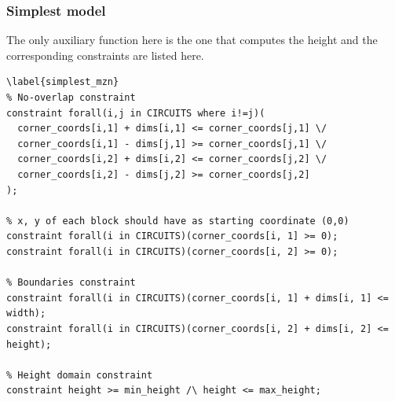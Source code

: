 \subsubsection{Simplest model}\label{simplest_model}
The only auxiliary function here is the one that computes the height and the corresponding constraints are listed here.
\begin{center}
    \begin{lstlisting}[language=Mzn]\label{simplest_mzn}
% No-overlap constraint
constraint forall(i,j in CIRCUITS where i!=j)(
  corner_coords[i,1] + dims[i,1] <= corner_coords[j,1] \/
  corner_coords[i,1] - dims[j,1] >= corner_coords[j,1] \/
  corner_coords[i,2] + dims[i,2] <= corner_coords[j,2] \/
  corner_coords[i,2] - dims[j,2] >= corner_coords[j,2]
);

% x, y of each block should have as starting coordinate (0,0)
constraint forall(i in CIRCUITS)(corner_coords[i, 1] >= 0);
constraint forall(i in CIRCUITS)(corner_coords[i, 2] >= 0);

% Boundaries constraint
constraint forall(i in CIRCUITS)(corner_coords[i, 1] + dims[i, 1] <= width);
constraint forall(i in CIRCUITS)(corner_coords[i, 2] + dims[i, 2] <= height);

% Height domain constraint
constraint height >= min_height /\ height <= max_height;

    \end{lstlisting}
\end{center}
